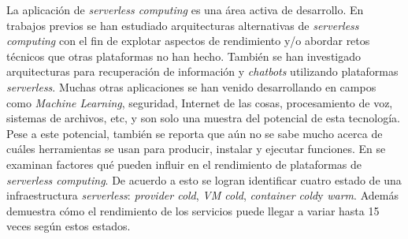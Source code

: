 La aplicación de \emph{serverless computing} es una área activa de desarrollo. En trabajos previos \cite{7979855,hendrickson2016serverless} se han estudiado arquitecturas alternativas de \emph{serverless computing} con el fin de explotar aspectos de rendimiento y/o abordar retos técnicos que otras plataformas no han hecho. También se han investigado arquitecturas para recuperación de información\cite{Crane:2017:ESA:3121050.3121086} y \emph{chatbots}\cite{Yan:2016:BCS:3007203.3007217} utilizando plataformas \emph{serverless}. Muchas otras aplicaciones se han venido desarrollando en campos como \emph{Machine Learning}, seguridad, Internet de las cosas, procesamiento de voz, sistemas de archivos, etc, y son solo una muestra del potencial de esta tecnología. Pese a este potencial, también se reporta que aún no se sabe mucho acerca de cuáles herramientas se usan para producir, instalar y ejecutar funciones\cite{Spillner:2017:PTS:3147213.3149452}. En \cite{8360324} se examinan factores qué pueden influir en el rendimiento de plataformas de \emph{serverless computing}. De acuerdo a esto se logran identificar cuatro estado de una infraestructura \emph{serverless}: \emph{provider cold}, \emph{VM cold}, \emph{container cold}y \emph{warm}. Además demuestra cómo el rendimiento de los servicios puede llegar a variar hasta 15 veces según estos estados.
